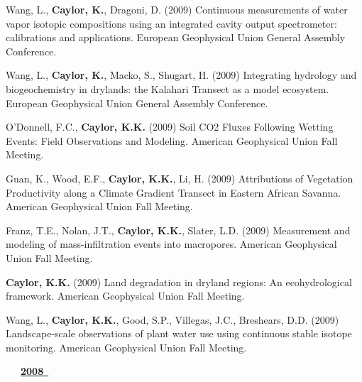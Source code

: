 \begin{etaremune}
\item Wang, L., \textbf{ Caylor, K.}, Dragoni, D. (2009) Continuous measurements of water vapor isotopic compositions using an integrated cavity output spectrometer: calibrations and applications. European Geophysical Union General Assembly Conference.
\item Wang, L., \textbf{ Caylor, K.}, Macko, S., Shugart, H. (2009) Integrating hydrology and biogeochemistry in drylands: the Kalahari Transect as a model ecosystem. European Geophysical Union General Assembly Conference.
\item O'Donnell, F.C., \textbf{ Caylor, K.K.} (2009) Soil CO2 Fluxes Following Wetting Events: Field Observations and Modeling. American Geophysical Union Fall Meeting.
\item Guan, K., Wood, E.F., \textbf{ Caylor, K.K.}, Li, H. (2009) Attributions of Vegetation Productivity along a Climate Gradient Transect in Eastern African Savanna. American Geophysical Union Fall Meeting.
\item Franz, T.E., Nolan, J.T., \textbf{ Caylor, K.K.}, Slater, L.D. (2009) Measurement and modeling of mass-infiltration events into macropores. American Geophysical Union Fall Meeting.
\item \textbf{ Caylor, K.K.} (2009) Land degradation in dryland regions: An ecohydrological framework. American Geophysical Union Fall Meeting.
\item Wang, L., \textbf{ Caylor, K.K.}, Good, S.P., Villegas, J.C., Breshears, D.D. (2009) Landscape-scale observations of plant water use using continuous stable isotope monitoring. American Geophysical Union Fall Meeting.

\vspace{0.1in}
\mbox{\ \ \ \underline{\textbf{2008 }}}
\vspace{0.1in}


\end{etaremune}
